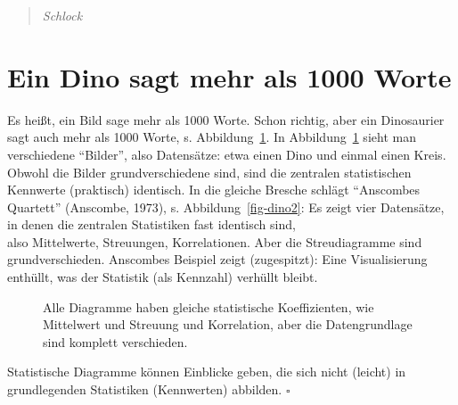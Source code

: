 \documentclass[
  letterpaper,
]{scrbook}
\theoremstyle{definition}
\theoremstyle{definition}
\theoremstyle{definition}
\theoremstyle{remark}
\begin{document}
\begin{quote}
{} \emph{Schlock}
\end{quote}

\section{Ein Dino sagt mehr als 1000
Worte}\label{ein-dino-sagt-mehr-als-1000-worte}

Es heißt, ein Bild sage mehr als 1000 Worte. Schon richtig, aber ein
Dinosaurier sagt auch mehr als 1000 Worte, s. Abbildung~\ref{fig-dino1}.
In Abbildung~\ref{fig-dino1} sieht man verschiedene ``Bilder'', also
Datensätze: etwa einen Dino und einmal einen Kreis. Obwohl die Bilder
grundverschiedene sind, sind die zentralen statistischen Kennwerte
(praktisch) identisch. In die gleiche Bresche schlägt ``Anscombes
Quartett'' (Anscombe, 1973), s. Abbildung~\ref{fig-dino2}: Es zeigt vier
Datensätze, in denen die zentralen Statistiken fast identisch sind,\\
also Mittelwerte, Streuungen, Korrelationen. Aber die Streudiagramme
sind grundverschieden. Anscombes Beispiel zeigt (zugespitzt): Eine
Visualisierung enthüllt, was der Statistik (als Kennzahl) verhüllt
bleibt.

\begin{figure}


\caption{\label{fig-dino1}Alle Diagramme haben gleiche statistische
Koeffizienten, wie Mittelwert und Streuung und Korrelation, aber die
Datengrundlage sind komplett verschieden.}

\end{figure}%

\begin{tcolorbox}[enhanced jigsaw, colbacktitle=quarto-callout-important-color!10!white, coltitle=black, bottomrule=.15mm, rightrule=.15mm, arc=.35mm, toptitle=1mm, colframe=quarto-callout-important-color-frame, opacitybacktitle=0.6, left=2mm, leftrule=.75mm, breakable, opacityback=0, bottomtitle=1mm, titlerule=0mm, title=\textcolor{quarto-callout-important-color}{\faExclamation}\hspace{0.5em}{Wichtig}, colback=white, toprule=.15mm]

Statistische Diagramme können Einblicke geben, die sich nicht (leicht)
in grundlegenden Statistiken (Kennwerten) abbilden. \(\square\)

\end{tcolorbox}
\end{document}
